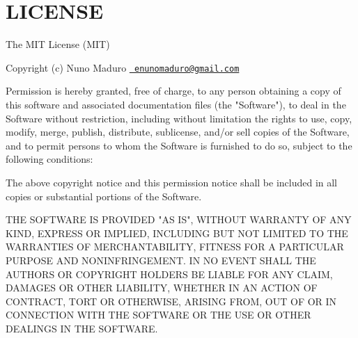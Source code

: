 \chapter{LICENSE}
\hypertarget{md_vendor_2nunomaduro_2termwind_2_l_i_c_e_n_s_e}{}\label{md_vendor_2nunomaduro_2termwind_2_l_i_c_e_n_s_e}
The MIT License (MIT)

Copyright (c) Nuno Maduro \href{mailto:enunomaduro@gmail.com}{\texttt{ enunomaduro@gmail.\+com}}

Permission is hereby granted, free of charge, to any person obtaining a copy of this software and associated documentation files (the "{}\+Software"{}), to deal in the Software without restriction, including without limitation the rights to use, copy, modify, merge, publish, distribute, sublicense, and/or sell copies of the Software, and to permit persons to whom the Software is furnished to do so, subject to the following conditions\+:

The above copyright notice and this permission notice shall be included in all copies or substantial portions of the Software.

THE SOFTWARE IS PROVIDED "{}\+AS IS"{}, WITHOUT WARRANTY OF ANY KIND, EXPRESS OR IMPLIED, INCLUDING BUT NOT LIMITED TO THE WARRANTIES OF MERCHANTABILITY, FITNESS FOR A PARTICULAR PURPOSE AND NONINFRINGEMENT. IN NO EVENT SHALL THE AUTHORS OR COPYRIGHT HOLDERS BE LIABLE FOR ANY CLAIM, DAMAGES OR OTHER LIABILITY, WHETHER IN AN ACTION OF CONTRACT, TORT OR OTHERWISE, ARISING FROM, OUT OF OR IN CONNECTION WITH THE SOFTWARE OR THE USE OR OTHER DEALINGS IN THE SOFTWARE. 